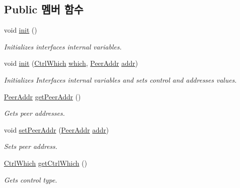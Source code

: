 \subsection*{Public 멤버 함수}
\begin{DoxyCompactItemize}
\item 
void \hyperlink{class_win_n_pipe_ctrl_message_a02fd73d861ef2e4aabb38c0c9ff82947}{init} ()
\begin{DoxyCompactList}\small\item\em Initializes interface\textquotesingle{}s internal variables. \end{DoxyCompactList}\item 
void \hyperlink{class_win_n_pipe_ctrl_message_af98b1ab6d357eb034f3ac76961ae488a}{init} (\hyperlink{windows__ipc_8hpp_a584396bb9236c4d39596e9f285a43313}{Ctrl\+Which} \hyperlink{class_win_n_pipe_ctrl_message_a05a30a0c0a7ecee05dd02c8d03e6f1d5}{which}, \hyperlink{class_peer_addr}{Peer\+Addr} \hyperlink{class_win_n_pipe_ctrl_message_a2fac2b1fbbf46cf80895a34807da1e5f}{addr})
\begin{DoxyCompactList}\small\item\em Initializes Interface\textquotesingle{}s internal variables and sets control and addresses values. \end{DoxyCompactList}\item 
\hyperlink{class_peer_addr}{Peer\+Addr} \hyperlink{class_win_n_pipe_ctrl_message_add027d29cceaae4dab0cebbb7af5e862}{get\+Peer\+Addr} ()
\begin{DoxyCompactList}\small\item\em Gets peer addresses. \end{DoxyCompactList}\item 
void \hyperlink{class_win_n_pipe_ctrl_message_a13b8119a6e65834bd74f3f783f8a29fb}{set\+Peer\+Addr} (\hyperlink{class_peer_addr}{Peer\+Addr} \hyperlink{class_win_n_pipe_ctrl_message_a2fac2b1fbbf46cf80895a34807da1e5f}{addr})
\begin{DoxyCompactList}\small\item\em Sets peer address. \end{DoxyCompactList}\item 
\hyperlink{windows__ipc_8hpp_a584396bb9236c4d39596e9f285a43313}{Ctrl\+Which} \hyperlink{class_win_n_pipe_ctrl_message_a8071f03da06c94ba7cf881afc402f7ff}{get\+Ctrl\+Which} ()
\begin{DoxyCompactList}\small\item\em Gets control type. \end{DoxyCompactList}\item 

\end{DoxyCompactItemize}

